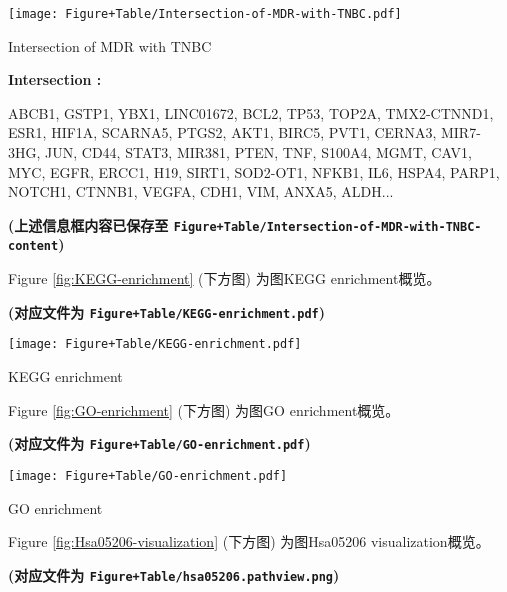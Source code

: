 \documentclass[
]{article}
\begin{document}
\def\@captype{figure}
\begin{center}
\texttt{[image: Figure+Table/Intersection-of-MDR-with-TNBC.pdf]}
\caption{Intersection of MDR with TNBC}\label{fig:Intersection-of-MDR-with-TNBC}
\end{center}
\begin{center}\begin{tcolorbox}[colback=gray!10, colframe=gray!50, width=0.9\linewidth, arc=1mm, boxrule=0.5pt]
\textbf{
Intersection
:}

\vspace{0.5em}

    ABCB1, GSTP1, YBX1, LINC01672, BCL2, TP53, TOP2A,
TMX2-CTNND1, ESR1, HIF1A, SCARNA5, PTGS2, AKT1, BIRC5,
PVT1, CERNA3, MIR7-3HG, JUN, CD44, STAT3, MIR381, PTEN,
TNF, S100A4, MGMT, CAV1, MYC, EGFR, ERCC1, H19, SIRT1,
SOD2-OT1, NFKB1, IL6, HSPA4, PARP1, NOTCH1, CTNNB1, VEGFA,
CDH1, VIM, ANXA5, ALDH...

\vspace{2em}
\end{tcolorbox}
\end{center}

\textbf{(上述信息框内容已保存至 \texttt{Figure+Table/Intersection-of-MDR-with-TNBC-content})}

Figure \ref{fig:KEGG-enrichment} (下方图) 为图KEGG enrichment概览。

\textbf{(对应文件为 \texttt{Figure+Table/KEGG-enrichment.pdf})}

\def\@captype{figure}
\begin{center}
\texttt{[image: Figure+Table/KEGG-enrichment.pdf]}
\caption{KEGG enrichment}\label{fig:KEGG-enrichment}
\end{center}

Figure \ref{fig:GO-enrichment} (下方图) 为图GO enrichment概览。

\textbf{(对应文件为 \texttt{Figure+Table/GO-enrichment.pdf})}

\def\@captype{figure}
\begin{center}
\texttt{[image: Figure+Table/GO-enrichment.pdf]}
\caption{GO enrichment}\label{fig:GO-enrichment}
\end{center}

Figure \ref{fig:Hsa05206-visualization} (下方图) 为图Hsa05206 visualization概览。

\textbf{(对应文件为 \texttt{Figure+Table/hsa05206.pathview.png})}
\end{document}
